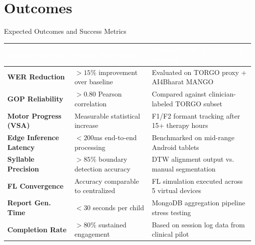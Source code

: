 \documentclass[aspectratio=169, 11pt, xcolor=table]{beamer}
\begin{document}
\section{Outcomes}
\begin{frame}{Expected Outcomes and Success Metrics}
    \vspace{-2mm}
    \centering
    \scriptsize
    \renewcommand{\arraystretch}{1.3}
    \begin{tabularx}{\textwidth}{|>{}l|L|L|}
        \hline
        \textcolor{white}{\textbf{Evaluated Metric}} & \textcolor{white}{\textbf{Target Threshold}} & \textcolor{white}{\textbf{Measurement / Validation Method}} \\
        \hline
        \textbf{WER Reduction} & $> 15\%$ improvement over baseline & Evaluated on TORGO proxy + AI4Bharat MANGO \\
        \hline
        \textbf{GOP Reliability} & $> 0.80$ Pearson correlation & Compared against clinician-labeled TORGO subset \\
        \hline
        \textbf{Motor Progress (VSA)} & Measurable statistical increase & F1/F2 formant tracking after 15+ therapy hours \\
        \hline
        \textbf{Edge Inference Latency} & $< 200$ms end-to-end processing & Benchmarked on mid-range Android tablets \\
        \hline
        \textbf{Syllable Precision} & $> 85\%$ boundary detection accuracy & DTW alignment output vs. manual segmentation \\
        \hline
        \textbf{FL Convergence} & Accuracy comparable to centralized & FL simulation executed across 5 virtual devices \\
        \hline
        \textbf{Report Gen. Time} & $< 30$ seconds per child & MongoDB aggregation pipeline stress testing \\
        \hline
        \textbf{Completion Rate} & $> 80\%$ sustained engagement & Based on session log data from clinical pilot \\
        \hline
    \end{tabularx}
\end{frame}

\end{document}
